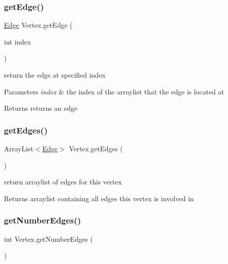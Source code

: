 \subsubsection{\texorpdfstring{get\+Edge()}{getEdge()}}
{\footnotesize\ttfamily \hyperlink{class_edge}{Edge} Vertex.\+get\+Edge (\begin{DoxyParamCaption}\item[{int}]{index }\end{DoxyParamCaption})}



return the edge at specified index 


\begin{DoxyParams}{Parameters}
{\em index} & the index of the arraylist that the edge is located at \\
\hline
\end{DoxyParams}
\begin{DoxyReturn}{Returns}
returns an edge 
\end{DoxyReturn}
\mbox{\label{class_vertex_a25a9ddc7d963c1f7a762d8f6b68376dc}} 
\subsubsection{\texorpdfstring{get\+Edges()}{getEdges()}}
{\footnotesize\ttfamily Array\+List$<$\hyperlink{class_edge}{Edge}$>$ Vertex.\+get\+Edges (\begin{DoxyParamCaption}{ }\end{DoxyParamCaption})}



return arraylist of edges for this vertex 

\begin{DoxyReturn}{Returns}
arraylist containing all edges this vertex is involved in 
\end{DoxyReturn}
\mbox{\label{class_vertex_a3da0cb5ceb6e70ffbdfd84941fa69b4a}} 
\subsubsection{\texorpdfstring{get\+Number\+Edges()}{getNumberEdges()}}
{\footnotesize\ttfamily int Vertex.\+get\+Number\+Edges (\begin{DoxyParamCaption}{ }\end{DoxyParamCaption})}




